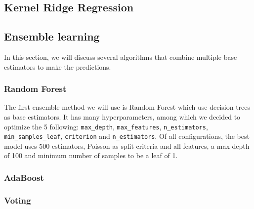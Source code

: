\subsection{Kernel Ridge Regression}%
\label{ssub:kernel-ridge-regression}

\subsection{Ensemble learning}%
\label{ssub:ensemble}

In this section, we will discuss several algorithms that combine multiple base estimators to make the predictions.

\subsubsection{Random Forest}
The first ensemble method we will use is Random Forest which use decision trees as base estimators.  It has many hyperparameters, among which we decided to optimize the 5 following: \texttt{max\_depth}, \texttt{max\_features}, \texttt{n\_estimators}, \texttt{min\_samples\_leaf}, \texttt{criterion} and \texttt{n\_estimators}. Of all configurations, the best model uses 500 estimators, Poisson as split criteria and all features, a max depth of 100 and minimum number of samples to be a leaf of 1.



\subsubsection{AdaBoost}

\subsubsection{Voting}

